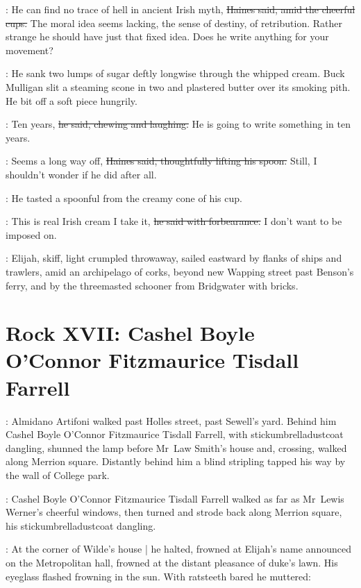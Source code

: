 \haines:
He can find no trace of hell in ancient Irish myth,
\sout{Haines said,
amid the cheerful cups.}
The moral idea seems lacking,
the sense of destiny, of retribution.
Rather strange he should have just that fixed idea.
Does he write anything for your movement?

:
He sank two lumps of sugar deftly longwise
through the whipped cream.
Buck Mulligan slit a steaming scone in two
and plastered butter
over its smoking pith.
He bit off a soft piece hungrily.

\mulligan:
Ten years,
\sout{he said,
chewing and laughing.}
He is going to write something in ten years.%

\haines:
Seems a long way off,
\sout{Haines said,
thoughtfully lifting his spoon.}
Still, I shouldn't wonder if he did after all.

:
He tasted a spoonful from the creamy cone of his cup.

\haines:
This is real Irish cream I take it,
\sout{he said with forbearance.}
I don't want to be imposed on.

\begin{interject}
    :
    Elijah,
    skiff,
    light crumpled throwaway,
    sailed eastward by flanks of
    ships and trawlers,
    amid an archipelago of corks,
    beyond new Wapping street
    past Benson's ferry,
    and by the threemasted schooner  from
    Bridgwater with bricks.
\end{interject}


\section*{Rock XVII: Cashel Boyle O'Connor Fitzmaurice Tisdall Farrell}

:
Almidano Artifoni walked past Holles street,%
past Sewell's yard.
Behind him
Cashel Boyle O'Connor Fitzmaurice Tisdall Farrell,
with stick\-umbrella\-dust\-coat dangling,
shunned the lamp before Mr~Law Smith's house
and, crossing, walked along Merrion square.
Distantly behind him
a blind stripling tapped his way
by the wall of College park.

:
Cashel Boyle O'Connor Fitzmaurice Tisdall Farrell
walked as far as
Mr~Lewis Werner's cheerful windows,
then turned and strode back along Merrion square,
his stick\-umbrella\-dust\-coat dangling.

:
At the corner of Wilde's house |
he halted,
frowned at Elijah's name announced on the Metropolitan hall,%
frowned at the distant pleasance of duke's lawn.
His eyeglass flashed frowning in the sun.
With ratsteeth bared he muttered:

